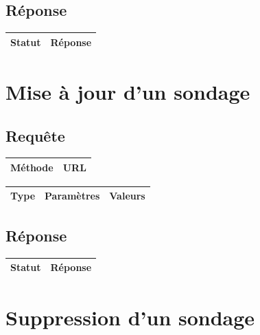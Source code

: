 \documentclass[titlepage]{report}
\begin{document}
\section{Réponse}

\begin{center}
	\begin{tabular}{|c|c|}
		\hline
		Statut & Réponse \\
		\hline
		
	\end{tabular}
\end{center}


\chapter{Mise à jour d'un sondage}

\section{Requête}

\begin{center}
	\begin{tabular}{|c|c|}
		\hline
		Méthode & URL \\
		\hline
		
	\end{tabular}
\end{center}


\begin{center}
	\begin{tabular}{|c|c|c|}
		\hline
		Type & Paramètres & Valeurs \\
		\hline
		
	\end{tabular}
\end{center}


\section{Réponse}

\begin{center}
	\begin{tabular}{|c|c|}
		\hline
		Statut & Réponse \\
		\hline
		
	\end{tabular}
\end{center}


\chapter{Suppression d'un sondage}
\end{document}
